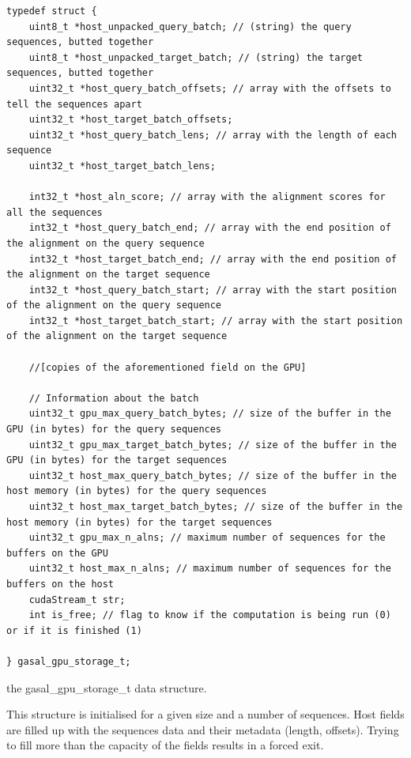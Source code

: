 \begin{listing}
	\begin{verbatim}
typedef struct {	
	uint8_t *host_unpacked_query_batch; // (string) the query sequences, butted together
	uint8_t *host_unpacked_target_batch; // (string) the target sequences, butted together
	uint32_t *host_query_batch_offsets; // array with the offsets to tell the sequences apart
	uint32_t *host_target_batch_offsets;
	uint32_t *host_query_batch_lens; // array with the length of each sequence
	uint32_t *host_target_batch_lens;
	
	int32_t *host_aln_score; // array with the alignment scores for all the sequences
	int32_t *host_query_batch_end; // array with the end position of the alignment on the query sequence
	int32_t *host_target_batch_end; // array with the end position of the alignment on the target sequence
	int32_t *host_query_batch_start; // array with the start position of the alignment on the query sequence
	int32_t *host_target_batch_start; // array with the start position of the alignment on the target sequence
	
	//[copies of the aforementioned field on the GPU]
	
	// Information about the batch
	uint32_t gpu_max_query_batch_bytes; // size of the buffer in the GPU (in bytes) for the query sequences
	uint32_t gpu_max_target_batch_bytes; // size of the buffer in the GPU (in bytes) for the target sequences
	uint32_t host_max_query_batch_bytes; // size of the buffer in the host memory (in bytes) for the query sequences
	uint32_t host_max_target_batch_bytes; // size of the buffer in the host memory (in bytes) for the target sequences
	uint32_t gpu_max_n_alns; // maximum number of sequences for the buffers on the GPU
	uint32_t host_max_n_alns; // maximum number of sequences for the buffers on the host
	cudaStream_t str; 
	int is_free; // flag to know if the computation is being run (0) or if it is finished (1)

} gasal_gpu_storage_t;
	\end{verbatim}
	\caption{the gasal\_gpu\_storage\_t data structure.}
	\label{lst:gpu_storage}
\end{listing}


This structure is initialised for a given size and a number of sequences. Host fields are filled up with the sequences data and their metadata (length, offsets). Trying to fill more than the capacity of the fields results in a forced exit.

